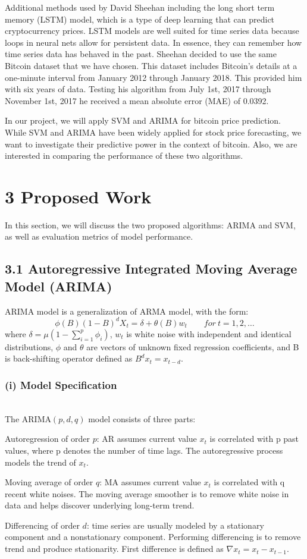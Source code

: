 \documentclass[letterpaper]{article} %
\begin{document}
\par
Additional methods used by David Sheehan \cite{sheehan} including the long short term memory (LSTM) model, which is a type of deep learning that can predict cryptocurrency prices. LSTM models are well suited for time series data because loops in neural nets allow for persistent data. In essence, they can remember how time series data has behaved in the past. Sheehan decided to use the same Bitcoin dataset that we have chosen. This dataset includes Bitcoin’s details at a one-minute interval from January 2012 through January 2018. This provided him with six years of data. Testing his algorithm from July 1st, 2017 through November 1st, 2017 he received a mean absolute error (MAE) of 0.0392.
\par
In our project, we will apply SVM and ARIMA for bitcoin price prediction. While SVM and ARIMA have been widely applied for stock price forecasting, we want to investigate their predictive power in the context of bitcoin. Also, we are interested in comparing the performance of these two algorithms.


\section{3 Proposed Work}
In this section, we will discuss the two proposed algorithms: ARIMA and SVM, as well as evaluation metrics of model performance.
\subsection*{3.1 Autoregressive Integrated Moving Average Model (ARIMA)}
ARIMA model is a generalization of ARMA model, with the form:
$$\phi(B)(1-B)^dX_t=\delta+\theta(B)w_t  \qquad for ~ t = 1,2,… $$
where $\delta = \mu(1-\sum_{i=1}^{p}\phi_i)$, $w_t$ is white noise with independent and identical distributions, $\phi$ and $\theta$ are vectors of unknown fixed regression coefficients, and B is back-shifting operator defined as $B^dx_t=x_{t-d}$.

\subsubsection*{(i) Model Specification}~\\
The ARIMA$(p,d,q)$ model consists of three parts:
\par
Autoregression of order $p$: AR assumes current value $x_t$ is correlated with p past values, where p denotes the number of time lags. The autoregressive process models the trend of $x_t$.
\par
Moving average of order $q$: MA assumes current value $x_t$ is correlated with q recent white noises. The moving average smoother is to remove white noise in data and helps discover underlying long-term trend.
\par
Differencing of order $d$: time series are usually modeled by a stationary component and a nonstationary component. Performing differencing is to remove trend and produce stationarity. First difference is defined as $\nabla x_t=x_t-x_{t-1}$.
\end{document}
